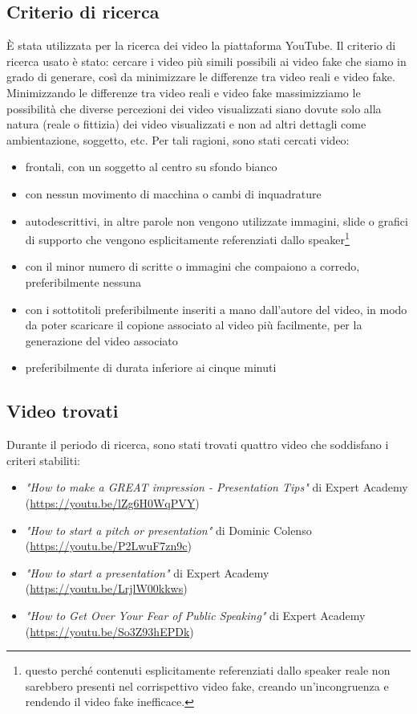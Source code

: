 \subsection{Criterio di ricerca}
È stata utilizzata per la ricerca dei video la piattaforma YouTube. Il criterio di ricerca usato è stato: cercare i video più simili possibili ai video fake che siamo in grado di generare, così da minimizzare le differenze tra video reali e video fake. Minimizzando le differenze tra video reali e video fake massimizziamo le possibilità che diverse percezioni dei video visualizzati siano dovute solo alla natura (reale o fittizia) dei video visualizzati e non ad altri dettagli come ambientazione, soggetto, etc. Per tali ragioni, sono stati cercati video:
\begin{itemize}
    \item frontali, con un soggetto al centro su sfondo bianco
    \item con nessun movimento di macchina o cambi di inquadrature
    \item autodescrittivi, in altre parole non vengono utilizzate immagini, slide o grafici di supporto che vengono esplicitamente referenziati dallo speaker\footnote{questo perché contenuti esplicitamente referenziati dallo speaker reale non sarebbero presenti nel corrispettivo video fake, creando un'incongruenza e rendendo il video fake inefficace.}
    \item con il minor numero di scritte o immagini che compaiono a corredo, preferibilmente nessuna
    \item con i sottotitoli preferibilmente inseriti a mano dall'autore del video, in modo da poter scaricare il copione associato al video più facilmente, per la generazione del video associato
    \item preferibilmente di durata inferiore ai cinque minuti
\end{itemize}

\subsection{Video trovati}

Durante il periodo di ricerca, sono stati trovati quattro video che soddisfano i criteri stabiliti:
\begin{itemize}
    \item \textit{"How to make a GREAT impression - Presentation Tips"} di Expert Academy \\ (\url{https://youtu.be/lZg6H0WqPVY})
    \item \textit{"How to start a pitch or presentation"} di Dominic Colenso \\(\url{https://youtu.be/P2LwuF7zn9c})
    \item \textit{"How to start a presentation"} di Expert Academy \\(\url{https://youtu.be/LrjlW00kkws})
    \item \textit{"How to Get Over Your Fear of Public Speaking"} di Expert Academy \\ (\url{https://youtu.be/So3Z93hEPDk})
\end{itemize}


